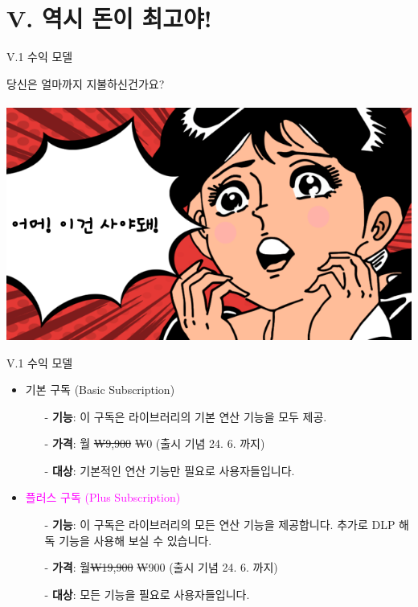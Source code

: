 \documentclass{beamer}
\begin{document}
\section{V. 역시 돈이 최고야!}
\begin{frame}{V.1 수익 모델}
	\begin{center}
		당신은 얼마까지 지불하신건가요?\\
		\ \\
		\includegraphics[scale=.3]{pay.png}
	\end{center}
\end{frame}
\begin{frame}{V.1 수익 모델}
	\begin{itemize}[<+->]
		\item 기본 구독 (Basic Subscription)
		\begin{itemize}
			\item[-] \textbf{기능}: 이 구독은 라이브러리의 기본 연산 기능을 모두 제공.
			\item[-] \textbf{가격}: 월 \sout{₩9,900} ₩0 (출시 기념 24. 6. 까지)
			\item[-] \textbf{대상}: 기본적인 연산 기능만 필요로 사용자들입니다.
		\end{itemize}
		\item \textcolor{magenta}{플러스 구독 (Plus Subscription)}
		\begin{itemize}
			\item[-] \textbf{기능}: 이 구독은 라이브러리의 모든 연산 기능을 제공합니다. 추가로 DLP 해독 기능을 사용해 보실 수 있습니다.
			\item[-] \textbf{가격}: 월\sout{₩19,900} ₩900 (출시 기념 24. 6. 까지)
			\item[-] \textbf{대상}: 모든 기능을 필요로 사용자들입니다.
		\end{itemize}
	\end{itemize}
\end{frame}
\end{document}
